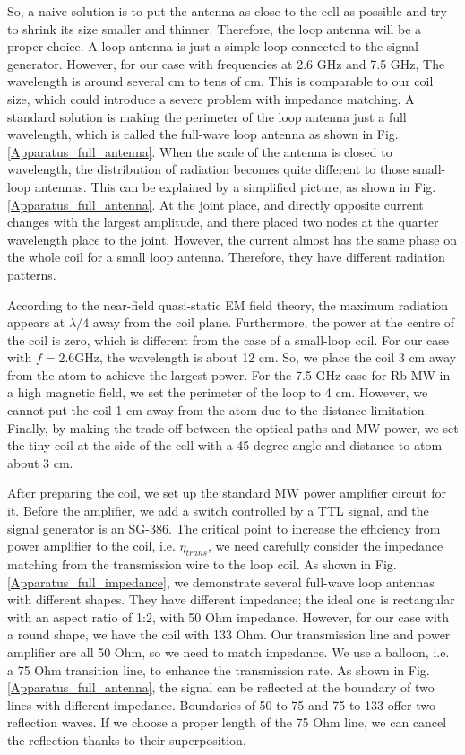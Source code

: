 So, a naive solution is to put the antenna as close to the cell as possible and try to shrink its size smaller and thinner. Therefore, the loop antenna will be a proper choice. A loop antenna is just a simple loop connected to the signal generator. However, for our case with frequencies at 2.6 GHz and 7.5 GHz, The wavelength is around several cm to tens of cm. This is comparable to our coil size, which could introduce a severe problem with impedance matching. A standard solution is making the perimeter of the loop antenna just a full wavelength, which is called the full-wave loop antenna as shown in Fig. \ref{Apparatus_full_antenna}. When the scale of the antenna is closed to wavelength, the distribution of radiation becomes quite different to those small-loop antennas. This can be explained by a simplified picture, as shown in Fig. \ref{Apparatus_full_antenna}. At the joint place, and directly opposite current changes with the largest amplitude, and there placed two nodes at the quarter wavelength place to the joint. However, the current almost has the same phase on the whole coil for a small loop antenna. Therefore, they have different radiation patterns.

According to the near-field quasi-static EM field theory, the maximum radiation appears at \(\lambda/4\) away from the coil plane. Furthermore, the power at the centre of the coil is zero, which is different from the case of a small-loop coil. For our case with $f=2.6$GHz, the wavelength is about 12 cm. So, we place the coil 3 cm away from the atom to achieve the largest power. For the 7.5 GHz case for Rb MW in a high magnetic field, we set the perimeter of the loop to 4 cm. However, we cannot put the coil 1 cm away from the atom due to the distance limitation. Finally, by making the trade-off between the optical paths and MW power, we set the tiny coil at the side of the cell with a 45-degree angle and distance to atom about 3 cm. 

After preparing the coil, we set up the standard MW power amplifier circuit for it. Before the amplifier, we add a switch controlled by a TTL signal, and the signal generator is an SG-386. The critical point to increase the efficiency from power amplifier to the coil, i.e. \(\eta_{trans}\), we need carefully consider the impedance matching from the transmission wire to the loop coil. As shown in Fig. \ref{Apparatus_full_impedance}, we demonstrate several full-wave loop antennas with different shapes. They have different impedance; the ideal one is rectangular with an aspect ratio of 1:2, with 50 Ohm impedance. However, for our case with a round shape, we have the coil with 133 Ohm. Our transmission line and power amplifier are all 50 Ohm, so we need to match impedance. We use a balloon, i.e. a 75 Ohm transition line, to enhance the transmission rate. As shown in Fig. \ref{Apparatus_full_antenna}, the signal can be reflected at the boundary of two lines with different impedance. Boundaries of 50-to-75 and 75-to-133 offer two reflection waves. If we choose a proper length of the 75 Ohm line, we can cancel the reflection thanks to their superposition. 


